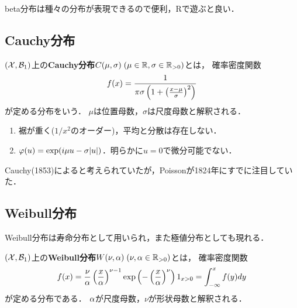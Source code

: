 \documentclass[uplatex,dvipdfmx]{jsreport}
\begin{document}
\begin{remark}
    beta分布は種々の分布が表現できるので便利，Rで遊ぶと良い．
\end{remark}

\subsection{Cauchy分布}

\begin{definition}
    $(\mathcal{X},\mathcal{B}_1)$上の\textbf{Cauchy分布}$C(\mu,\sigma)\;(\mu\in\mathbb{R},\sigma\in\mathbb{R}_{>0})$とは，
    確率密度関数
    \[f(x)=\frac{1}{\pi\sigma\left(1+\left(\frac{x-\mu}{\sigma}\right)^2\right)}\]
    が定める分布をいう．
    $\mu$は位置母数，$\sigma$は尺度母数と解釈される．
\end{definition}

\begin{proposition}\mbox{}
    \begin{enumerate}
        \item 裾が重く($1/x^2$のオーダー)，平均と分散は存在しない．
        \item $\varphi(u)=\exp(i\mu u-\sigma\lvert u\rvert)$．明らかに$u=0$で微分可能でない．
    \end{enumerate}
\end{proposition}

\begin{history}
    Cauchy(1853)によると考えられていたが，Poissonが1824年にすでに注目していた．
\end{history}

\subsection{Weibull分布}

\begin{tcolorbox}[colframe=ForestGreen, colback=ForestGreen!10!white,breakable,colbacktitle=ForestGreen!40!white,coltitle=black,fonttitle=\bfseries\sffamily,
title=]
    Weibull分布は寿命分布として用いられ，また極値分布としても現れる．
\end{tcolorbox}

\begin{definition}
    $(\mathcal{X},\mathcal{B}_1)$上の\textbf{Weibull分布}$W(\nu,\alpha)\;(\nu,\alpha\in\mathbb{R}_{>0})$とは，
    確率密度関数
    \[f(x)=\frac{\nu}{\alpha}\left(\frac{x}{\alpha}\right)^{\nu-1}\exp\left(-\left(\frac{x}{\alpha}\right)^\nu\right)1_{x>0}=\int^x_{-\infty}f(y)dy\]
    が定める分布である．
    $\alpha$が尺度母数，$\nu$が形状母数と解釈される．
\end{definition}
\end{document}
